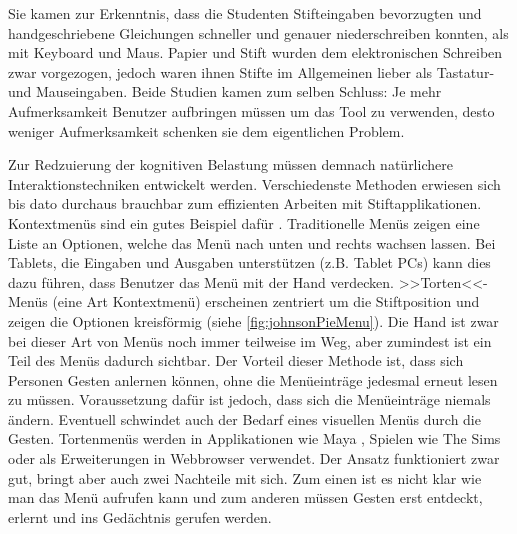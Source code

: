 Sie kamen zur Erkenntnis, dass die Studenten Stifteingaben bevorzugten und handgeschriebene Gleichungen schneller und genauer niederschreiben konnten, als mit Keyboard und Maus. Papier und Stift wurden dem elektronischen Schreiben zwar vorgezogen, jedoch waren ihnen Stifte im Allgemeinen lieber als Tastatur- und Mauseingaben. Beide Studien kamen zum selben Schluss: Je mehr Aufmerksamkeit Benutzer aufbringen müssen um das Tool zu verwenden, desto weniger Aufmerksamkeit schenken sie dem eigentlichen Problem.

\medskip Zur Redzuierung der kognitiven Belastung müssen demnach natürlichere Interaktionstechniken entwickelt werden. Verschiedenste Methoden erwiesen sich bis dato durchaus brauchbar zum effizienten Arbeiten mit Stiftapplikationen. Kontextmenüs sind ein gutes Beispiel dafür \citep{Kurtenbach:1991}. Traditionelle Menüs zeigen eine Liste an Optionen, welche das Menü nach unten und rechts wachsen lassen. Bei Tablets, die Eingaben und Ausgaben unterstützen (z.B. Tablet PCs) kann dies dazu führen, dass Benutzer das Menü mit der Hand verdecken. >>Torten<<-Menüs (eine Art Kontextmenü) erscheinen zentriert um die Stiftposition und zeigen die Optionen kreisförmig (siehe \autoref{fig:johnsonPieMenu}). Die Hand ist zwar bei dieser Art von Menüs noch immer teilweise im Weg, aber zumindest ist ein Teil des Menüs dadurch sichtbar. Der Vorteil dieser Methode ist, dass sich Personen Gesten anlernen können, ohne die Menüeinträge jedesmal erneut lesen zu müssen. Voraussetzung dafür ist jedoch, dass sich die Menüeinträge niemals ändern. Eventuell schwindet auch der Bedarf eines visuellen Menüs durch die Gesten. Tortenmenüs werden in Applikationen wie Maya \citep{Maya:2010}, Spielen wie The Sims \citep{EA:2010} oder als Erweiterungen in Webbrowser verwendet. Der Ansatz funktioniert zwar gut, bringt aber auch zwei Nachteile mit sich. Zum einen ist es nicht klar wie man das Menü aufrufen kann und zum anderen müssen Gesten erst entdeckt, erlernt und ins Gedächtnis gerufen werden.

